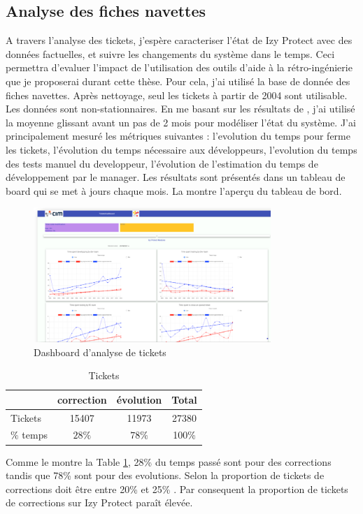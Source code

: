 \documentclass[a4paper]{article}
\begin{document}
\subsection{Analyse des fiches navettes}
\label{sec:analyseDesFichesNavettes}
A travers l'analyse des tickets, j'espère  caracteriser l'état de Izy Protect avec des données factuelles, 
et suivre  les changements du système dans le temps.
Ceci permettra  d'evaluer l'impact de l'utilisation des outils d'aide à la rétro-ingénierie que je proposerai durant cette thèse.
Pour cela, j'ai utilisé la base de donnée des fiches navettes. 
Après nettoyage, seul les tickets à partir de 2004 sont utilisable. 
Les données sont non-stationnaires. 
En me basant sur les résultats de \cite{Raja09}, j'ai utilisé la moyenne glissant avant un pas de 2 mois pour modéliser l'état du système.
J'ai principalement mesuré les métriques suivantes : l'evolution du temps pour ferme les tickets, l'évolution du temps nécessaire aux développeurs, l'evolution du temps des tests manuel du developpeur, l'évolution de l'estimation du temps de développement par le manager.
Les résultats sont présentés dans un tableau de board qui se met à jours chaque mois.
La  montre l'aperçu du tableau de bord.
\begin{figure}[htbp]
  \begin{center}
  \includegraphics[width=0.8\textwidth]{./figures/dashboard.png}
  \caption{Dashboard d'analyse de tickets}
  \label{fig:dashboardFig}
\end{center}
\vspace{-0.3cm}
\end{figure}


\begin{table}[htbp]
  \begin{center}
    \caption{Tickets}
    \label{tab:proportion}
    \begin{tabular}{| l | c |c|c|}
      \hline
       & correction  & évolution  & Total\\
      \hline
      Tickets &15407 & 11973  & 27380\\
      \hline
      $\%$ temps & $28\%$ & $78\%$ & 100\% \\
      \hline 
    \end{tabular}
  \end{center}  
\end{table}
Comme le montre la Table \ref{tab:proportion}, 28\% du temps passé sont pour des corrections tandis que 78\% sont  pour des evolutions.
Selon \citet{Pigo96a} la proportion de tickets de corrections doit être entre 20\% et 25\% . 
Par consequent la proportion de tickets de corrections sur Izy Protect paraît élevée.
\end{document}
